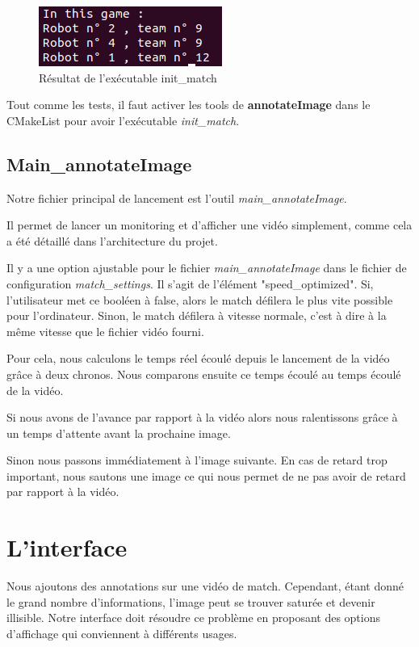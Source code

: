 \begin{figure}[h] 
\centering 
\includegraphics[scale = 0.5]{images/init_match.png}
    \caption{Résultat de l'exécutable init\_match}
    \label{fig:init_match}
\end{figure}


Tout comme les tests, il faut activer les tools de
\textbf{annotateImage} dans le CMakeList pour avoir l'exécutable
\textit{init\_match}.


\subsection{Main\_annotateImage}

Notre fichier principal de lancement est l'outil
\textit{main\_annotateImage}.

Il permet de lancer un monitoring et d'afficher une vidéo
simplement, comme cela a été détaillé dans l'architecture du
projet.
\bigskip

Il y a une option ajustable pour le fichier
\textit{main\_annotateImage} dans le fichier de configuration
\textit{match\_settings}. Il s'agit de l'élément
"speed\_optimized". Si, l'utilisateur met ce booléen à false,
alors le match défilera le plus vite possible pour l'ordinateur.
Sinon, le match défilera à vitesse normale, c'est à dire à la
même vitesse que le fichier vidéo fourni.
\bigskip

Pour cela, nous calculons le temps réel écoulé depuis le
lancement de la vidéo grâce à deux chronos. Nous comparons
ensuite ce temps écoulé au temps écoulé de la vidéo.
\bigskip

Si nous avons de l'avance par rapport à la vidéo alors nous
ralentissons grâce à un temps d'attente avant la prochaine image.

Sinon nous passons immédiatement à l'image suivante. En cas de
retard trop important, nous sautons une image ce qui nous permet
de ne pas avoir de retard par rapport à la vidéo.

\section{L'interface}


Nous ajoutons des annotations sur une vidéo de match. Cependant,
étant donné le grand nombre d'informations, l'image peut se
trouver saturée et devenir illisible. Notre interface doit
résoudre ce problème en proposant des options d'affichage qui
conviennent à différents usages.
\bigskip

